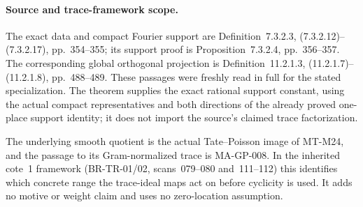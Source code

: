 \paragraph{Source and trace-framework scope.}
The exact data and compact Fourier support are
Definition~7.3.2.3, (7.3.2.12)--(7.3.2.17), pp.~354--355;
its support proof is Proposition~7.3.2.4, pp.~356--357.
The corresponding global orthogonal projection is
Definition~11.2.1.3, (11.2.1.7)--(11.2.1.8), pp.~488--489.
These passages were freshly read in full for the stated
specialization.  The theorem supplies the exact rational
support constant, using the actual compact representatives
and both directions of the already proved one-place support
identity; it does not import the source's claimed trace
factorization.

The underlying smooth quotient is the actual Tate--Poisson
image of MT-M24, and the passage to its Gram-normalized
trace is MA-GP-008.  In the inherited cote~1 framework
(BR-TR-01/02, scans~079--080 and~111--112) this identifies
which concrete range the trace-ideal maps act on before
cyclicity is used.  It adds no motive or weight claim and
uses no zero-location assumption.
